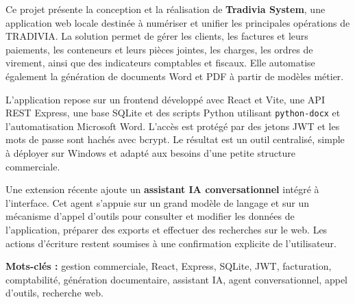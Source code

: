 \documentclass[12pt,a4paper,oneside]{report}
\newcommand{\code}[1]{\texttt{#1}}
\begin{document}
Ce projet présente la conception et la réalisation de \textbf{Tradivia System}, une application web locale destinée à numériser et unifier les principales opérations de TRADIVIA. La solution permet de gérer les clients, les factures et leurs paiements, les conteneurs et leurs pièces jointes, les charges, les ordres de virement, ainsi que des indicateurs comptables et fiscaux. Elle automatise également la génération de documents Word et PDF à partir de modèles métier.

L'application repose sur un frontend développé avec React et Vite, une API REST Express, une base SQLite et des scripts Python utilisant \code{python-docx} et l'automatisation Microsoft Word. L'accès est protégé par des jetons JWT et les mots de passe sont hachés avec bcrypt. Le résultat est un outil centralisé, simple à déployer sur Windows et adapté aux besoins d'une petite structure commerciale.

Une extension récente ajoute un \textbf{assistant IA conversationnel} intégré à l'interface. Cet agent s'appuie sur un grand modèle de langage et sur un mécanisme d'appel d'outils pour consulter et modifier les données de l'application, préparer des exports et effectuer des recherches sur le web. Les actions d'écriture restent soumises à une confirmation explicite de l'utilisateur.

\textbf{Mots-clés :} gestion commerciale, React, Express, SQLite, JWT, facturation, comptabilité, génération documentaire, assistant IA, agent conversationnel, appel d'outils, recherche web.
\end{document}
